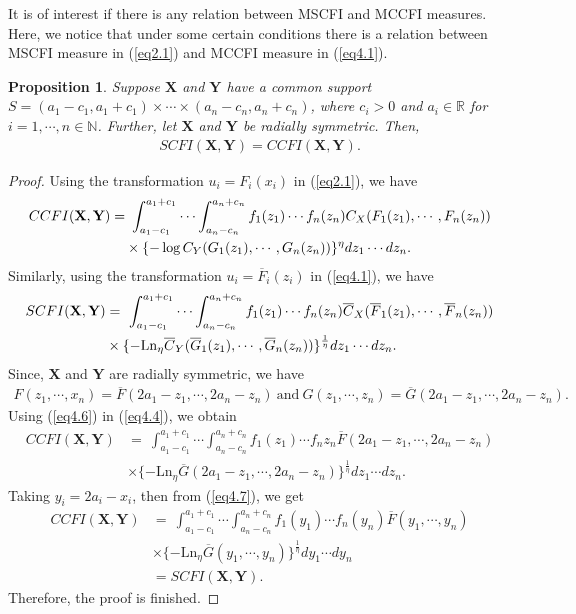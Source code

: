 \documentclass[12pt, a4paper]{article}
\numberwithin{equation}{section}
\newtheorem{proposition}{Proposition}[section]
\begin{document}
It is of interest if there is any relation between MSCFI and MCCFI measures. Here, we notice that under some certain conditions there is a relation between MSCFI measure in (\ref{eq2.1}) and MCCFI measure in (\ref{eq4.1}).
\begin{proposition}\label{prop4.2}
Suppose $\textbf{X}$ and $\textbf{Y}$ have a common support $S=(a_1-c_1,a_1+c_1)\times\cdots\times(a_n-c_n,a_n+c_n)$, where $c_i>0$ and $a_i\in\mathbb{R}$ for $i=1,\cdots,n\in\mathbb{N}$. Further, let $\textbf{X}$ and $\textbf{Y}$ be radially symmetric. Then,
\begin{align*}
SCFI(\textbf{X},\textbf{Y})=CCFI(\textbf{X},\textbf{Y}).
\end{align*}
\end{proposition}
\begin{proof}
Using the transformation $u_i=F_i(x_i)$ in (\ref{eq2.1}), we have
\begin{align}\label{eq4.4}
CCFI(\textbf{X},\textbf{Y\textbf{}})=&\ \int_{a_1-c_1}^{a_1+c_1}\cdots\int_{a_n-c_n}^{a_n+c_n}f_1(z_1)\cdots f_n(z_n)C_X(F_1(z_1),\cdots,F_n(z_n))\nonumber\\
&\times \{-\log C_Y(G_1(z_1),\cdots,G_n(z_n))\}^{\eta}dz_1\cdots dz_n.
\end{align}
Similarly, using the transformation $u_i=\overline F_i(z_i)$ in (\ref{eq4.1}), we have
\begin{align}\label{eq4.5}
SCFI(\textbf{X},\textbf{Y\textbf{}})&=\ \int_{a_1-c_1}^{a_1+c_1}\cdots\int_{a_n-c_n}^{a_n+c_n}f_1(z_1)\cdots f_n(z_n)\overline C_X(\overline F_1(z_1),\cdots,\overline F_n(z_n))\nonumber\\
&\times \{-\mathrm{Ln}_\eta \overline C_Y(\overline G_1(z_1),\cdots,\overline G_n(z_n))\}^{\frac{1}{\eta}}dz_1\cdots dz_n.
\end{align}
 Since, $\textbf{X}$ and $\textbf{Y}$ are radially symmetric, we have 
 \begin{align}\label{eq4.6}
 F(z_1,\cdots,x_n)=\overline F(2a_1-z_1,\cdots,2a_n-z_n)~\text{and}~G(z_1,\cdots,z_n)=\overline G(2a_1-z_1,\cdots,2a_n-z_n).
 \end{align}
Using (\ref{eq4.6}) in (\ref{eq4.4}), we obtain
\begin{align}\label{eq4.7}
CCFI(\textbf{X},\textbf{Y})&=\ \int_{a_1-c_1}^{a_1+c_1}\cdots\int_{a_n-c_n}^{a_n+c_n}f_1(z_1)\cdots f_nz_n\overline F(2a_1-z_1,\cdots,2a_n-z_n)\nonumber\\
&\times \{-\mathrm{Ln}_\eta\overline G(2a_1-z_1,\cdots,2a_n-z_n)\}^{\frac{1}{\eta}}dz_1\cdots dz_n.
\end{align}
Taking $y_i=2a_i-x_i$, then from (\ref{eq4.7}), we get
\begin{align*}
CCFI(\textbf{X},\textbf{Y})&=\ \int_{a_1-c_1}^{a_1+c_1}\cdots\int_{a_n-c_n}^{a_n+c_n}f_1(y_1)\cdots f_n(y_n)\overline F(y_1,\cdots,y_n)\nonumber\\
&\times \{-\mathrm{Ln}_\eta\overline G(y_1,\cdots,y_n)\}^{\frac{1}{\eta}}dy_1\cdots dy_n\nonumber\\
&=SCFI(\textbf{X},\textbf{Y}).
\end{align*}
Therefore, the proof is finished.
\end{proof}
\end{document}
